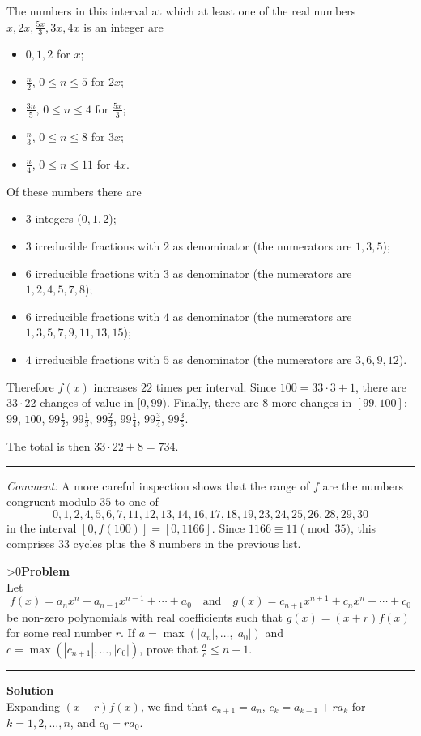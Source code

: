 \documentclass[12pt,oneside,a4paper]{book}
\newcounter{probnum}
\newcounter{solnum}
\newcommand{\prob}{\ifnum\value{probnum}>0\newpage\fi\setcounter{solnum}{0}\stepcounter{probnum}\textbf{Problem \theprobnum}\\}
\newcommand{\comment}{\medskip\hrule\medbreak\emph{Comment: }}
\newcommand{\sol}{\medskip\hrule\medbreak\textbf{Solution}\\}
\begin{document}
The numbers in this interval at which at least one of the real numbers $x,2x,\frac{5x}3,3x,4x$ is an integer are
\begin{itemize}
\item $0,1,2$ for $x$;
\item $\frac n2$, $0\le n\le 5$ for $2x$;
\item $\frac{3n}5$, $0\le n\le 4$ for $\frac{5x}3$;
\item $\frac n3$, $0\le n\le 8$ for $3x$;
\item $\frac n4$, $0\le n\le 11$ for $4x$.
\end{itemize}

Of these numbers there are
\begin{itemize}
\item $3$ integers ($0,1,2$);
\item $3$ irreducible fractions with $2$ as denominator (the numerators are $1,3,5$);
\item $6$ irreducible fractions with $3$ as denominator (the numerators are $1,2,4,5,7,8$);
\item $6$ irreducible fractions with $4$ as denominator (the numerators are $1,3,5,7,9,11,13,15$);
\item $4$ irreducible fractions with $5$ as denominator (the numerators are $3,6,9,12$).
\end{itemize}

Therefore $f(x)$ increases $22$ times per interval. Since $100 = 33\cdot 3 + 1$, there are $33\cdot 22$ changes of value in $[0,99)$. Finally, there are $8$ more changes in $[99,100]$: $99$, $100$, $99\frac12$, $99\frac13$, $99\frac23$, $99\frac14$, $99\frac34$, $99\frac35$.

The total is then $33\cdot 22+8=734$.

\comment
A more careful inspection shows that the range of $f$ are the numbers congruent modulo $35$ to one of
\[0, 1, 2, 4, 5, 6, 7, 11, 12, 13, 14, 16, 17, 18, 19, 23, 24, 25, 26, 28, 29, 30\]
in the interval $[0,f(100)] = [0,1166]$. Since $1166 \equiv 11\pmod{35}$, this comprises $33$ cycles plus the $8$ numbers in the previous list.

\prob Let
\[f(x) = a_nx^n+a_{n-1}x^{n-1}+\cdots+a_0\quad\text{and}\quad g(x)=c_{n+1}x^{n+1}+c_nx^n+\cdots+c_0\]
be non-zero polynomials with real coefficients such that $g(x)=(x+r)f(x)$ for some real number $r$. If $a=\max(|a_n|,\ldots,|a_0|)$ and $c=\max(|c_{n+1}|,\ldots,|c_0|)$, prove that $\frac ac \le n+1$.

\sol
Expanding $(x+r)f(x)$, we find that $c_{n+1} = a_n$, $c_k=a_{k-1}+ra_k$ for $k=1,2,\ldots,n$, and $c_0=ra_0$.
\end{document}
